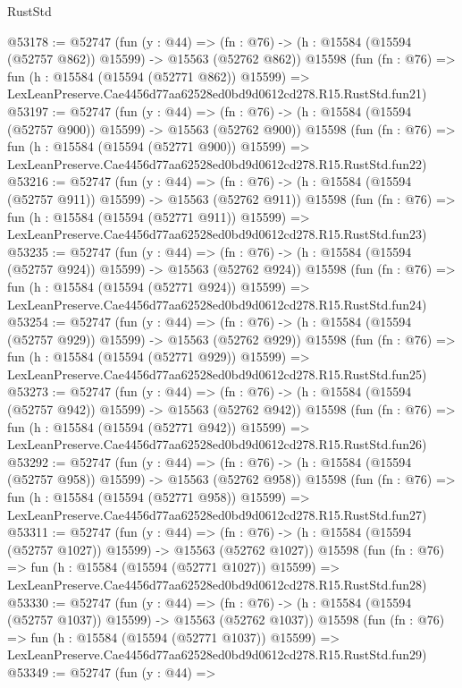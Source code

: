 \begin{lexlean}{RustStd}
\begin{coremodule}
@53178 := @52747
    (fun (y : @44) =>
    (fn : @76) -> (h : @15584 (@15594 (@52757 @862)) @15599) -> @15563 (@52762 @862))
    @15598
    (fun (fn : @76) =>
    fun (h : @15584 (@15594 (@52771 @862)) @15599) =>
    LexLeanPreserve.Cae4456d77aa62528ed0bd9d0612cd278.R15.RustStd.fun21)
@53197 := @52747
    (fun (y : @44) =>
    (fn : @76) -> (h : @15584 (@15594 (@52757 @900)) @15599) -> @15563 (@52762 @900))
    @15598
    (fun (fn : @76) =>
    fun (h : @15584 (@15594 (@52771 @900)) @15599) =>
    LexLeanPreserve.Cae4456d77aa62528ed0bd9d0612cd278.R15.RustStd.fun22)
@53216 := @52747
    (fun (y : @44) =>
    (fn : @76) -> (h : @15584 (@15594 (@52757 @911)) @15599) -> @15563 (@52762 @911))
    @15598
    (fun (fn : @76) =>
    fun (h : @15584 (@15594 (@52771 @911)) @15599) =>
    LexLeanPreserve.Cae4456d77aa62528ed0bd9d0612cd278.R15.RustStd.fun23)
@53235 := @52747
    (fun (y : @44) =>
    (fn : @76) -> (h : @15584 (@15594 (@52757 @924)) @15599) -> @15563 (@52762 @924))
    @15598
    (fun (fn : @76) =>
    fun (h : @15584 (@15594 (@52771 @924)) @15599) =>
    LexLeanPreserve.Cae4456d77aa62528ed0bd9d0612cd278.R15.RustStd.fun24)
@53254 := @52747
    (fun (y : @44) =>
    (fn : @76) -> (h : @15584 (@15594 (@52757 @929)) @15599) -> @15563 (@52762 @929))
    @15598
    (fun (fn : @76) =>
    fun (h : @15584 (@15594 (@52771 @929)) @15599) =>
    LexLeanPreserve.Cae4456d77aa62528ed0bd9d0612cd278.R15.RustStd.fun25)
@53273 := @52747
    (fun (y : @44) =>
    (fn : @76) -> (h : @15584 (@15594 (@52757 @942)) @15599) -> @15563 (@52762 @942))
    @15598
    (fun (fn : @76) =>
    fun (h : @15584 (@15594 (@52771 @942)) @15599) =>
    LexLeanPreserve.Cae4456d77aa62528ed0bd9d0612cd278.R15.RustStd.fun26)
@53292 := @52747
    (fun (y : @44) =>
    (fn : @76) -> (h : @15584 (@15594 (@52757 @958)) @15599) -> @15563 (@52762 @958))
    @15598
    (fun (fn : @76) =>
    fun (h : @15584 (@15594 (@52771 @958)) @15599) =>
    LexLeanPreserve.Cae4456d77aa62528ed0bd9d0612cd278.R15.RustStd.fun27)
@53311 := @52747
    (fun (y : @44) =>
    (fn : @76) -> (h : @15584 (@15594 (@52757 @1027)) @15599) -> @15563 (@52762 @1027))
    @15598
    (fun (fn : @76) =>
    fun (h : @15584 (@15594 (@52771 @1027)) @15599) =>
    LexLeanPreserve.Cae4456d77aa62528ed0bd9d0612cd278.R15.RustStd.fun28)
@53330 := @52747
    (fun (y : @44) =>
    (fn : @76) -> (h : @15584 (@15594 (@52757 @1037)) @15599) -> @15563 (@52762 @1037))
    @15598
    (fun (fn : @76) =>
    fun (h : @15584 (@15594 (@52771 @1037)) @15599) =>
    LexLeanPreserve.Cae4456d77aa62528ed0bd9d0612cd278.R15.RustStd.fun29)
@53349 := @52747
    (fun (y : @44) =>

\end{coremodule}
\end{lexlean}
